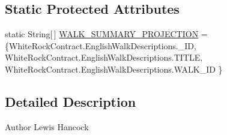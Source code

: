 \subsection*{Static Protected Attributes}
\begin{DoxyCompactItemize}
\item 
static String\mbox{[}$\,$\mbox{]} \hyperlink{classuk_1_1ac_1_1swan_1_1digitaltrails_1_1fragments_1_1_walk_list_fragment_a457173fbe4c810b68c502aa91dab8960}{W\+A\+L\+K\+\_\+\+S\+U\+M\+M\+A\+R\+Y\+\_\+\+P\+R\+O\+J\+E\+C\+T\+I\+O\+N} = \{White\+Rock\+Contract.\+English\+Walk\+Descriptions.\+\_\+\+I\+D, White\+Rock\+Contract.\+English\+Walk\+Descriptions.\+T\+I\+T\+L\+E, White\+Rock\+Contract.\+English\+Walk\+Descriptions.\+W\+A\+L\+K\+\_\+\+I\+D \}
\end{DoxyCompactItemize}


\subsection{Detailed Description}
\begin{DoxyAuthor}{Author}
Lewis Hancock 
\end{DoxyAuthor}


